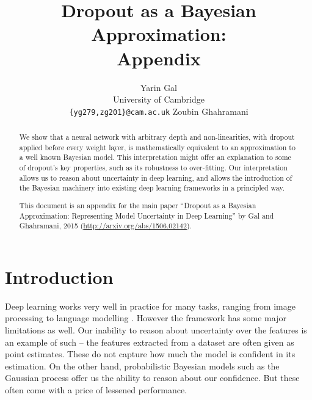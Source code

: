\documentclass{article} %
\title{Dropout as a Bayesian Approximation: \\
Appendix
}
\author{
\And
Yarin Gal 
\And
\\
University of Cambridge\\
\texttt{\{yg279,zg201\}@cam.ac.uk} 
\And
Zoubin Ghahramani
}
\def\red#1{\textcolor{red}{#1}}
\theoremstyle{definition}
\begin{document}
\maketitle

\begin{abstract} 

We show that a neural network with arbitrary depth and non-linearities, with dropout applied before every weight layer, is mathematically equivalent to an approximation to a well known Bayesian model. This interpretation might offer an explanation to some of dropout's key properties, such as its robustness to over-fitting. Our interpretation allows us to reason about uncertainty in deep learning, and allows the introduction of the Bayesian machinery into existing deep learning frameworks in a principled way. %

This document is an appendix for the main paper ``Dropout as a Bayesian Approximation: 
Representing Model Uncertainty in Deep Learning'' by Gal and Ghahramani, 2015 (\url{http://arxiv.org/abs/1506.02142}).
\end{abstract} 

\section{Introduction}

Deep learning works very well in practice for many tasks, ranging from image processing \citep{krizhevsky2012imagenet} to language modelling \citep{bengio2006neural}. However the framework has some major limitations as well. Our inability to reason about uncertainty over the features is an example of such -- the features extracted from a dataset are often given as point estimates. These do not capture how much the model is confident in its estimation. 
On the other hand, probabilistic Bayesian models such as the Gaussian process \citep{Rasmussen2005Gaussian} offer us the ability to reason about our confidence. But these often come with a price of lessened performance. 
\end{document}
